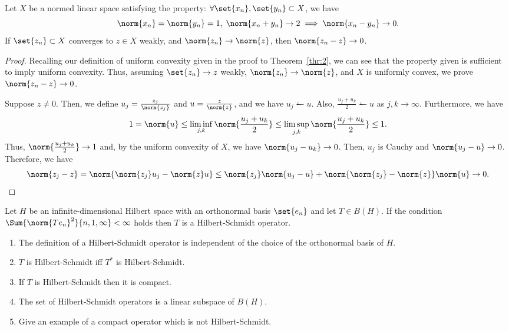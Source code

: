 \documentclass[12pt,letterpaper,twoside]{hmcpset}
\begin{document}
\begin{problem}[5][15]
  Let $X$ be a normed linear space satisfying the property: $\forall\set{x_n},\set{y_n} \subset X$, we have \[
  \norm{x_n} = \norm{y_n} = 1, \; \norm{x_n + y_n} \to 2 \implies \norm{x_n -y_n} \to 0.
  \]
  If $\set{z_n} \subset X$ converges to $z \in X$ weakly, and $\norm{z_n} \to \norm{z}$, then $\norm{z_n - z} \to 0$.
\end{problem}
\begin{solution}
  \begin{proof}
    Recalling our definition of uniform convexity given in the proof to Theorem~\ref{thr:2}, we can see that the property given is sufficient to imply uniform convexity.
    Thus, assuming $\set{z_n} \to z$ weakly, $\norm{z_n} \to \norm{z}$, and $X$ is uniformly convex, we prove $\norm{z_n - z} \to 0$.

    Suppose $z \not= 0$.
    Then, we define $u_j = \frac{z_j}{\norm{z_j}}$ and $u = \frac{z}{\norm{z}}$, and we have $u_j \leftharpoonup u$.
    Also, $\frac{u_j + u_k}{2} \leftharpoonup u$ as $j,k \to \infty$.
    Furthermore, we have \[
    1 = \norm{u} \leq \liminf_{j,k}\norm{\frac{u_j+u_k}{2}} \leq \limsup_{j,k}\norm{\frac{u_j + u_k}{2}} \leq 1.
    \]
    Thus, $\norm{\frac{u_j+u_k}{2}} \to 1$ and, by the uniform convexity of $X$, we have $\norm{u_j - u_k} \to 0$.
    Then, $u_j$ is Cauchy and $\norm{u_j - u} \to 0$.
    Therefore, we have \[
    \norm{z_j - z} = \norm{\norm{z_j}u_j - \norm{z}u} \leq \norm{z_j}\norm{u_j - u} + \norm{\norm{z_j} - \norm{z}}\norm{u} \to 0.
    \]

  \end{proof}
\end{solution}
\begin{problem}[6][30]
  Let $H$ be an infinite-dimensional Hilbert space with an orthonormal basis $\set{e_n}$ and let $T \in B(H)$.
  If the condition $\Sum{\norm{Te_n}^2}{n,1,\infty} < \infty$ holds then $T$ is a Hilbert-Schmidt operator.

  \begin{enumerate}[label=(\alph*)]
  \item The definition of a Hilbert-Schmidt operator is independent of the choice of the orthonormal basis of $H$.
  \item $T$ is Hilbert-Schmidt iff $T^*$ is Hilbert-Schmidt.
  \item If $T$ is Hilbert-Schmidt then it is compact.
  \item The set of Hilbert-Schmidt operators is a linear subspace of $B(H)$.
  \item Give an example of a compact operator which is not Hilbert-Schmidt.
  \end{enumerate}

\end{problem}
\end{document}
